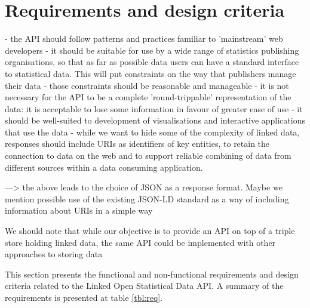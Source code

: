 \documentclass{llncs}
\begin{document}
\section{Requirements and design criteria}\label{sec:reqs}



- the API should follow patterns and practices familiar to 'mainstream' web developers
- it should be suitable for use by a wide range of statistics publishing organisations, so that as far as possible data users can have a standard interface to statistical data. This will put constraints on the way that publishers manage their data - those constraints should be reasonable and manageable
- it is not necessary for the API to be a complete 'round-trippable' representation of the data: it is acceptable to lose some information in favour of greater ease of use
- it should be well-suited to development of visualisations and interactive applications that use the data
- while we want to hide some of the complexity of linked data, responses should include URIs as identifiers of key entities, to retain the connection to data on the web and to support reliable combining of data from different sources within a data consuming application.

---> the above leads to the choice of JSON as a response format.  Maybe we mention possible use of the existing JSON-LD standard as a way of including information about URIs in a simple way

We should note that while our objective is to provide an API on top of a triple store holding linked data, the same API could be implemented with other approaches to storing data




This section presents the functional and non-functional requirements and design criteria related to the Linked Open Statistical Data API.
A summary of the requirements is presented at table \ref{tbl:req}.
\end{document}

